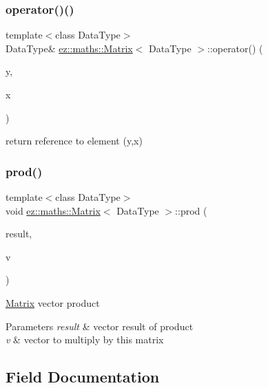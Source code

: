 \subsubsection{\texorpdfstring{operator()()}{operator()()}}
{\footnotesize\ttfamily template$<$class Data\+Type$>$ \\
Data\+Type\& \hyperlink{classez_1_1maths_1_1Matrix}{ez\+::maths\+::\+Matrix}$<$ Data\+Type $>$\+::operator() (\begin{DoxyParamCaption}\item[{natural}]{y,  }\item[{natural}]{x }\end{DoxyParamCaption})\hspace{0.3cm}{\ttfamily [inline]}}

return reference to element (y,x) \mbox{\label{classez_1_1maths_1_1Matrix_a28472a82209513ed5934209c0e8b5a7a}} 
\subsubsection{\texorpdfstring{prod()}{prod()}}
{\footnotesize\ttfamily template$<$class Data\+Type$>$ \\
void \hyperlink{classez_1_1maths_1_1Matrix}{ez\+::maths\+::\+Matrix}$<$ Data\+Type $>$\+::prod (\begin{DoxyParamCaption}\item[{\hyperlink{classez_1_1maths_1_1Vector}{ez\+::maths\+::\+Vector}$<$ Data\+Type $>$ \&}]{result,  }\item[{\hyperlink{classez_1_1maths_1_1Vector}{ez\+::maths\+::\+Vector}$<$ Data\+Type $>$ \&}]{v }\end{DoxyParamCaption})\hspace{0.3cm}{\ttfamily [inline]}}

\hyperlink{classez_1_1maths_1_1Matrix}{Matrix} vector product 
\begin{DoxyParams}{Parameters}
{\em result} & vector result of product \\
\hline
{\em v} & vector to multiply by this matrix \\
\hline
\end{DoxyParams}


\subsection{Field Documentation}
\mbox{\label{classez_1_1maths_1_1Matrix_a185697a4eb9527a6c3f0ecf59975f181}} 

